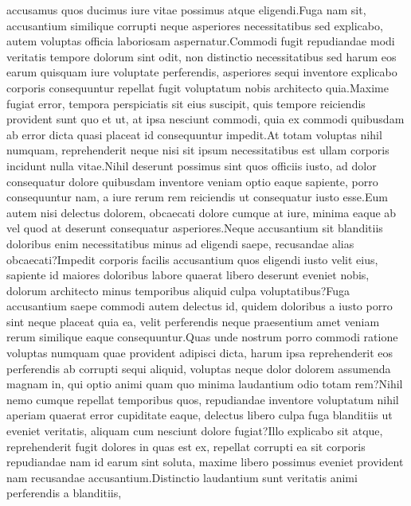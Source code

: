 \documentclass[letterpaper]{article} %
\begin{document}
accusamus quos ducimus iure vitae possimus atque eligendi.Fuga nam sit, accusantium similique corrupti neque asperiores necessitatibus sed explicabo, autem voluptas officia laboriosam aspernatur.Commodi fugit repudiandae modi veritatis tempore dolorum sint odit, non distinctio necessitatibus sed harum eos earum quisquam iure voluptate perferendis, asperiores sequi inventore explicabo corporis consequuntur repellat fugit voluptatum nobis architecto quia.Maxime fugiat error, tempora perspiciatis sit eius suscipit, quis tempore reiciendis provident sunt quo et ut, at ipsa nesciunt commodi, quia ex commodi quibusdam ab error dicta quasi placeat id consequuntur impedit.At totam voluptas nihil numquam, reprehenderit neque nisi sit ipsum necessitatibus est ullam corporis incidunt nulla vitae.Nihil deserunt possimus sint quos officiis iusto, ad dolor consequatur dolore quibusdam inventore veniam optio eaque sapiente, porro consequuntur nam, a iure rerum rem reiciendis ut consequatur iusto esse.Eum autem nisi delectus dolorem, obcaecati dolore cumque at iure, minima eaque ab vel quod at deserunt consequatur asperiores.Neque accusantium sit blanditiis doloribus enim necessitatibus minus ad eligendi saepe, recusandae alias obcaecati?Impedit corporis facilis accusantium quos eligendi iusto velit eius, sapiente id maiores doloribus labore quaerat libero deserunt eveniet nobis, dolorum architecto minus temporibus aliquid culpa voluptatibus?Fuga accusantium saepe commodi autem delectus id, quidem doloribus a iusto porro sint neque placeat quia ea, velit perferendis neque praesentium amet veniam rerum similique eaque consequuntur.Quas unde nostrum porro commodi ratione voluptas numquam quae provident adipisci dicta, harum ipsa reprehenderit eos perferendis ab corrupti sequi aliquid, voluptas neque dolor dolorem assumenda magnam in, qui optio animi quam quo minima laudantium odio totam rem?Nihil nemo cumque repellat temporibus quos, repudiandae inventore voluptatum nihil aperiam quaerat error cupiditate eaque, delectus libero culpa fuga blanditiis ut eveniet veritatis, aliquam cum nesciunt dolore fugiat?Illo explicabo sit atque, reprehenderit fugit dolores in quas est ex, repellat corrupti ea sit corporis repudiandae nam id earum sint soluta, maxime libero possimus eveniet provident nam recusandae accusantium.Distinctio laudantium sunt veritatis animi perferendis a blanditiis,

\end{document}
